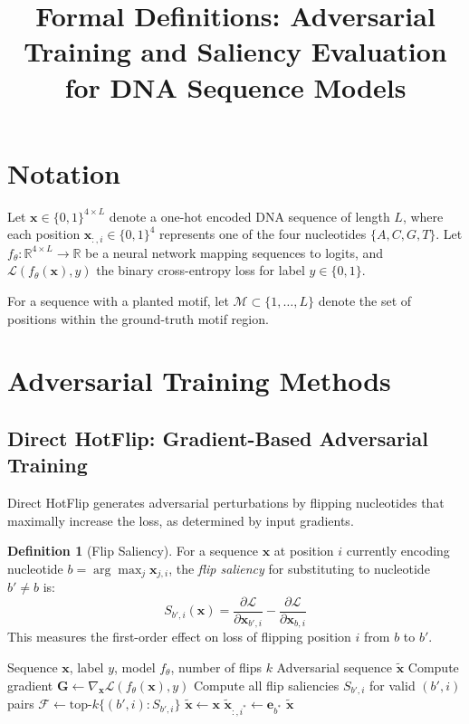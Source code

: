 \documentclass[11pt]{article}
\title{Formal Definitions: Adversarial Training and Saliency Evaluation for DNA Sequence Models}
\author{}
\date{}
\newcommand{\x}{\mathbf{x}}
\newcommand{\loss}{\mathcal{L}}
\newcommand{\model}{f_\theta}
\newcommand{\R}{\mathbb{R}}
\newcommand{\onehot}{\mathbf{e}}
\theoremstyle{definition}
\newtheorem{definition}{Definition}
\begin{document}
\maketitle

\section{Notation}

Let $\x \in \{0,1\}^{4 \times L}$ denote a one-hot encoded DNA sequence of length $L$, where each position $\x_{:,i} \in \{0,1\}^4$ represents one of the four nucleotides $\{A, C, G, T\}$. Let $\model: \R^{4 \times L} \to \R$ be a neural network mapping sequences to logits, and $\loss(\model(\x), y)$ the binary cross-entropy loss for label $y \in \{0,1\}$.

For a sequence with a planted motif, let $\mathcal{M} \subset \{1, \ldots, L\}$ denote the set of positions within the ground-truth motif region.

\section{Adversarial Training Methods}

\subsection{Direct HotFlip: Gradient-Based Adversarial Training}

Direct HotFlip generates adversarial perturbations by flipping nucleotides that maximally increase the loss, as determined by input gradients.

\begin{definition}[Flip Saliency]
For a sequence $\x$ at position $i$ currently encoding nucleotide $b = \arg\max_j \x_{j,i}$, the \emph{flip saliency} for substituting to nucleotide $b' \neq b$ is:
\begin{equation}
    S_{b',i}(\x) = \frac{\partial \loss}{\partial \x_{b',i}} - \frac{\partial \loss}{\partial \x_{b,i}}
\end{equation}
This measures the first-order effect on loss of flipping position $i$ from $b$ to $b'$.
\end{definition}

\begin{algorithm}[H]
\caption{Direct HotFlip Adversarial Example Generation}
\label{alg:direct-hotflip}
\begin{algorithmic}[1]
\REQUIRE Sequence $\x$, label $y$, model $\model$, number of flips $k$
\ENSURE Adversarial sequence $\tilde{\x}$
\STATE Compute gradient $\mathbf{G} \gets \nabla_{\x} \loss(\model(\x), y)$
\STATE Compute all flip saliencies $S_{b',i}$ for valid $(b', i)$ pairs
\STATE $\mathcal{F} \gets \text{top-}k\{(b', i) : S_{b',i}\}$ 
\STATE $\tilde{\x} \gets \x$
    \STATE $\tilde{\x}_{:,i^*} \gets \onehot_{b^*}$
\ENDFOR
\RETURN $\tilde{\x}$
\end{algorithmic}
\end{algorithm}
\end{document}
